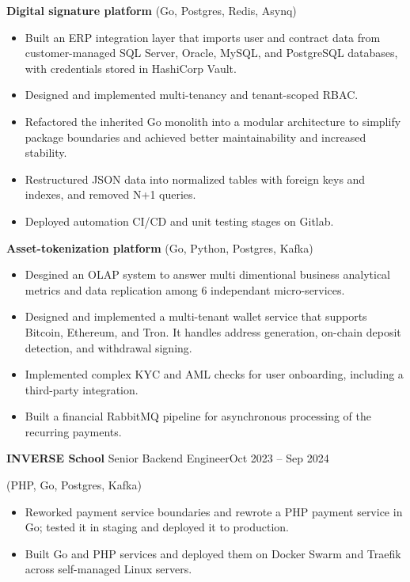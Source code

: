 \documentclass[10pt,a4paper]{article}
\newcommand{\datefont}{\sffamily}
\newcommand{\dates}[1]{{\datefont\fontsize{8.7}{10}\selectfont\color{soft}#1}}
\newif\ifaftersection
\newif\ifafterjob
\newcommand{\job}[3]{%
    \par\ifaftersection\global\aftersectionfalse\else\addvspace{6.5pt}\fi\noindent
    {\sffamily\bfseries\fontsize{10.4}{12.5}\selectfont #1}\hspace{0.7em}%
    {\sffamily\fontsize{9}{12.5}\selectfont\color{soft}#2}\hfill\dates{#3}\par\nobreak
    \global\afterjobtrue
}
\newcommand{\project}[1]{%
    \par\ifafterjob\global\afterjobfalse\addvspace{1.5pt}\else\addvspace{4.5pt}\fi\noindent
    {\sffamily\bfseries #1}\nobreak
}
\begin{document}
\project{Digital signature platform} {(Go, Postgres, Redis, Asynq)}

\begin{itemize}
    \item Built an ERP integration layer that imports user and contract
          data from customer-managed SQL Server, Oracle, MySQL, and PostgreSQL databases,
          with credentials stored in HashiCorp Vault.

    \item Designed and implemented multi-tenancy and tenant-scoped RBAC.

    \item Refactored the inherited Go monolith into a modular
          architecture to simplify package boundaries and achieved better maintainability and increased stability.

    \item Restructured JSON data into normalized tables with foreign keys and indexes,
          and removed N+1 queries.

    \item Deployed automation CI/CD and unit testing stages on Gitlab.
\end{itemize}

\project{Asset-tokenization platform} {(Go, Python, Postgres, Kafka)}

\begin{itemize}
    \item Desgined an OLAP system to answer multi dimentional business analytical metrics and data replication among 6 independant micro-services.

    \item Designed and implemented a multi-tenant wallet service that supports Bitcoin, Ethereum, and Tron.
          It handles address generation, on-chain deposit detection, and withdrawal signing.

    \item Implemented complex KYC and AML checks for user onboarding, including a third-party integration.

    \item Built a financial RabbitMQ pipeline for asynchronous processing of the recurring payments.
\end{itemize}

\job{INVERSE School}{Senior Backend Engineer}{Oct 2023 – Sep 2024} {(PHP, Go, Postgres, Kafka)}

\begin{itemize}
    \item Reworked payment service boundaries and rewrote a PHP payment service in Go;
          tested it in staging and deployed it to production.

    \item Built Go and PHP services and deployed them on Docker Swarm and Traefik
          across self-managed Linux servers.
\end{itemize}
\end{document}
